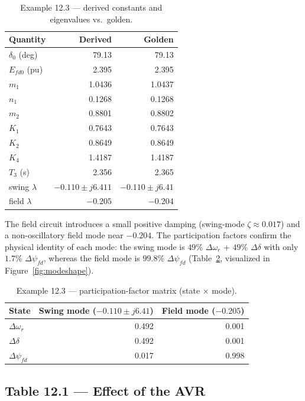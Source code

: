 \documentclass[12pt,a4paper]{article}
\newcommand{\dwr}{\Delta\omega_r}
\newcommand{\ddel}{\Delta\delta}
\newcommand{\dpsifd}{\Delta\psi_{fd}}
\begin{document}
\begin{table}[H]
\centering
\caption{Example 12.3 --- derived constants and eigenvalues vs.\ golden.}
\label{tab:kderiv}
\begin{tabular}{@{}lrr@{}}
\toprule
Quantity & Derived & Golden \\
\midrule
$\delta_0$ (deg) & 79.13 & 79.13 \\
$E_{fd0}$ (pu)   & 2.395 & 2.395 \\
$m_1$ & 1.0436 & 1.0437 \\
$n_1$ & 0.1268 & 0.1268 \\
$m_2$ & 0.8801 & 0.8802 \\
$K_1$            & 0.7643 & 0.7643 \\
$K_2$            & 0.8649 & 0.8649 \\
$K_4$            & 1.4187 & 1.4187 \\
$T_3$ (s)        & 2.356 & 2.365 \\
swing $\lambda$  & $-0.110\pm j6.411$ & $-0.110\pm j6.41$ \\
field $\lambda$  & $-0.205$ & $-0.204$ \\
\bottomrule
\end{tabular}
\end{table}

The field circuit introduces a small positive damping (swing-mode
$\zeta\approx0.017$) and a non-oscillatory field mode near $-0.204$. The
participation factors confirm the physical identity of each mode: the swing mode
is $49\%$ $\dwr$ + $49\%$ $\ddel$ with only $1.7\%$ $\dpsifd$, whereas the field
mode is $99.8\%$ $\dpsifd$ (Table~\ref{tab:partic}, visualized in
Figure~\ref{fig:modeshape}).

\begin{table}[H]
\centering
\caption{Example 12.3 --- participation-factor matrix (state $\times$ mode).}
\label{tab:partic}
\begin{tabular}{@{}lrr@{}}
\toprule
State & Swing mode ($-0.110\pm j6.41$) & Field mode ($-0.205$) \\
\midrule
$\dwr$    & 0.492 & 0.001 \\
$\ddel$   & 0.492 & 0.001 \\
$\dpsifd$ & 0.017 & 0.998 \\
\bottomrule
\end{tabular}
\end{table}

\subsection{Table 12.1 --- Effect of the AVR}
\label{sec:avr}
\end{document}
